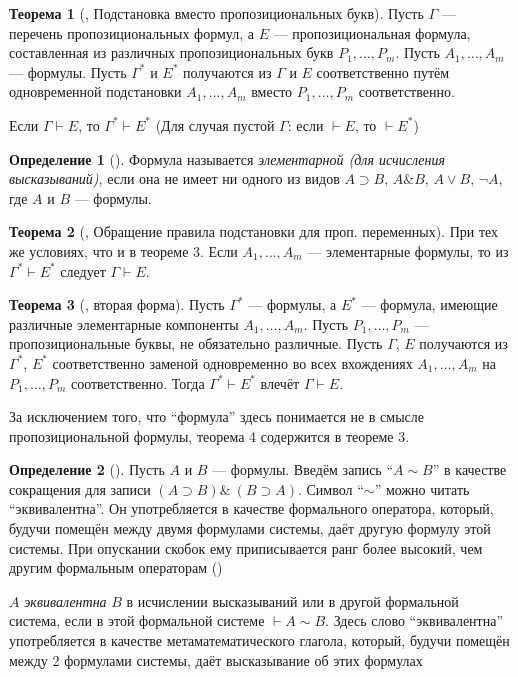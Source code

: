 \documentclass[a4paper, 12pt]{article}  %
\DeclareMathOperator{\conj}{\mathbb{\&}}
\theoremstyle{definition}
\newtheorem{theorem}{Теорема}
\newtheorem*{definition}{Определение}
\begin{document}
	\begin{theorem}[, Подстановка вместо пропозициональных букв]
		Пусть $\Gamma$ --- перечень пропозициональных формул, а $E$ --- пропозициональная формула, 
		составленная из различных пропозициональных букв $P_1, \dots, P_m$. Пусть 
		$A_1, \dots, A_m$ --- формулы. Пусть $\Gamma^*$ и $E^*$ получаются из $\Gamma$ и $E$ 
		соответственно путём одновременной подстановки $A_1, \dots, A_m$ вместо $P_1, \dots, P_m$ 
		соответственно. 
		
		Если $\Gamma \vdash E$, то $\Gamma^* \vdash E^*$ (Для случая пустой $\Gamma$: если 
		$\vdash E$, то $\vdash E^*$)
	\end{theorem}

	\begin{definition}[]
		Формула называется \textit{элементарной (для исчисления высказываний)}, если она не 
		имеет ни одного из видов $A \supset B$, $A \conj B$, $A \vee B$, $\neg A$, где $A$
		и  $B$ --- формулы.		
	\end{definition}

	\begin{theorem}[, Обращение правила подстановки для проп. переменных]
		При тех же условиях, что и в теореме 3. Если $A_1, \dots, A_m$ --- элементарные формулы, то
		из $\Gamma^* \vdash E^*$ следует $\Gamma \vdash E$.
	\end{theorem}

	\setcounter{theorem}{3}
	
	\begin{theorem}[, вторая форма]
		Пусть $\Gamma^*$ --- формулы, а $E^*$ --- формула, имеющие различные элементарные 
		компоненты $A_1, \dots, A_m$. Пусть $P_1, \dots, P_m$ --- пропозициональные буквы, не 
		обязательно различные. Пусть $\Gamma$, $E$ получаются из $\Gamma^*$, $E^*$ соответственно 
		заменой одновременно во всех вхождениях $A_1, \dots, A_m$ на $P_1, \dots, P_m$ 
		соответственно. Тогда $\Gamma^* \vdash E^*$ влечёт $\Gamma \vdash E$.
		
		За исключением того, что ``формула'' здесь понимается не в смысле пропозициональной 
		формулы, теорема 4 содержится в теореме 3.
	\end{theorem}

	\begin{definition}[]
		Пусть $A$ и $B$ --- формулы. Введём запись ``$A \sim B$'' в качестве сокращения для записи
		$(A \supset B) \conj\ (B \supset A)$. Символ ``$\sim$'' можно читать ``эквивалентна''. Он
		употребляется в качестве формального оператора, который, будучи помещён между двумя
		формулами системы, даёт другую формулу этой системы. При опускании скобок ему
		приписывается ранг более высокий, чем другим формальным операторам ()
		
		$A$ \textit{эквивалентна} $B$ в исчислении высказываний или в другой формальной система,
		если в этой формальной системе $\vdash A \sim B$. Здесь слово ``эквивалентна''
		употребляется в качестве метаматематического глагола, который, будучи помещён между 2
		формулами системы, даёт высказывание об этих формулах 
	\end{definition}
\end{document}
